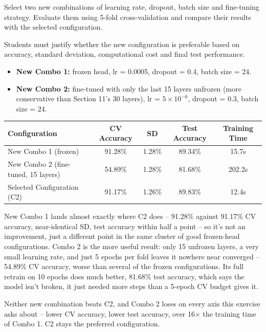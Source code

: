 \documentclass[10pt]{article}
\begin{document}
Select two new combinations of learning rate, dropout, batch size and
fine-tuning strategy. Evaluate them using 5-fold cross-validation and
compare their results with the selected configuration.

Students must justify whether the new configuration is preferable based on
accuracy, standard deviation, computational cost and final test performance.

\begin{itemize}
\item \textbf{New Combo 1:} frozen head, lr = 0.0005, dropout = 0.4, batch size = 24.
\item \textbf{New Combo 2:} fine-tuned with only the last 15 layers unfrozen
(more conservative than Section 11's 30 layers), lr = $5\times10^{-6}$,
dropout = 0.3, batch size = 24.
\end{itemize}

\begin{center}
\begin{tabular}{|l|c|c|c|c|}
\hline
Configuration & CV Accuracy & SD & Test Accuracy & Training Time\\
\hline
New Combo 1 (frozen) & 91.28\% & 1.28\% & 89.34\% & 15.7s\\
New Combo 2 (fine-tuned, 15 layers) & 54.89\% & 1.28\% & 81.68\% & 202.2s\\
Selected Configuration (C2) & 91.17\% & 1.26\% & 89.83\% & 12.4s\\
\hline
\end{tabular}
\end{center}

New Combo 1 lands almost exactly where C2 does -- 91.28\% against 91.17\% CV
accuracy, near-identical SD, test accuracy within half a point -- so it's not
an improvement, just a different point in the same cluster of good
frozen-head configurations. Combo 2 is the more useful result: only 15
unfrozen layers, a very small learning rate, and just 5 epochs per fold
leaves it nowhere near converged -- 54.89\% CV accuracy, worse than several
of the frozen configurations. Its full retrain on 10 epochs does much better,
81.68\% test accuracy, which says the model isn't broken,
it just needed more steps than a 5-epoch CV budget gives it.

Neither new combination beats C2, and Combo 2 loses on every axis this
exercise asks about -- lower CV accuracy, lower test accuracy, over
16$\times$ the training time of Combo 1. C2 stays the preferred
configuration.

\end{document}
